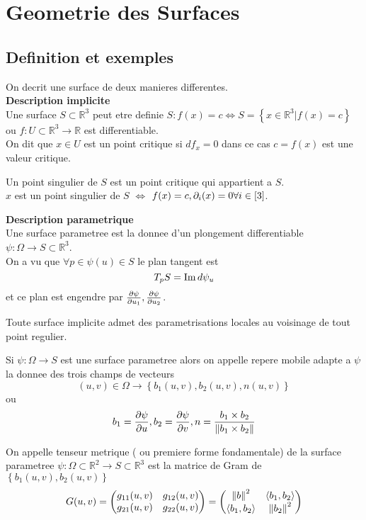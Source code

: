 \documentclass[../main.tex]{subfiles}
\begin{document}
\section{Geometrie des Surfaces}
\subsection*{Definition et exemples}
On decrit une surface de deux manieres differentes.\\
\textbf{  Description implicite }\\
	Une surface $S \subset \mathbb{R}^{3}$ peut etre definie $S: f( x) = c \iff S = \left\{ x \in \mathbb{R}^{3} | f( x) = c \right\} $ ou $f:U \subset \mathbb{R}^{3}\to \mathbb{R}$ est differentiable.\\
	On dit que $x\in U$ est un point critique si $df_x= 0$ dans ce cas $c= f( x) $ est une valeur critique.
	\begin{defn}
		Un point singulier de $S$ est un point critique qui appartient a $S$.\\
		$x$ est un point singulier de $S$ $\iff$ $f( x) =c, \partial_i( x) = 0 \forall i \in [ 3] $.
	\end{defn}
\textbf{Description parametrique}\\
Une surface parametree est la donnee d'un plongement differentiable $\psi: \Omega\to S \subset \mathbb{R}^{3}$.\\
On a vu que $\forall p \in \psi( u) \in S$ le plan tangent est
\[ 
T_pS = \operatorname{Im} d\psi_u
\]
et ce plan est engendre par $\frac{\partial\psi}{\partial u_1}, \frac{\partial \psi}{\partial u_2}$.
\begin{thm}
Toute surface implicite admet des parametrisations locales au voisinage de tout point regulier.	
\end{thm}
\begin{defn}
	Si $\psi: \Omega\to S$ est une surface parametree alors on appelle repere mobile adapte a $\psi$ la donnee des trois champs de vecteurs 
	\[ 
	( u,v) \in \Omega \to \left\{ b_1( u,v) , b_2( u,v), n( u,v)  \right\}
	\]
	ou 
	\[ 
	b_1= \frac{\partial \psi}{\partial u}, b_2 = \frac{\partial\psi}{\partial v}, n = \frac{b_1\times b_2}{\left\lVert b_1\times b_2\right\rVert }
	\]

	
\end{defn}
\begin{defn}
	On appelle tenseur metrique ( ou premiere forme fondamentale) de la surface parametree $\psi: \Omega \subset \mathbb{R}^{2}\to S \subset \mathbb{R}^{3}$ est la matrice de Gram de $ \left\{ b_1( u,v) , b_2( u,v)  \right\} $ 
	\[ 
	G( u,v) =
	\begin{pmatrix}
		g_{11}( u,v) & g_{12}( u,v) \\
		g_{21}( u,v) & g_{22}( u,v) 
	\end{pmatrix} 
	= 
	\begin{pmatrix}
		\left\lVert b\right\rVert ^{2} & \left\langle b_1,b_2\right\rangle \\
		\left\langle b_1,b_2\right\rangle & \left\lVert b_2\right\rVert ^{2}
	\end{pmatrix} 			
	\]
				
\end{defn}
\end{document}
